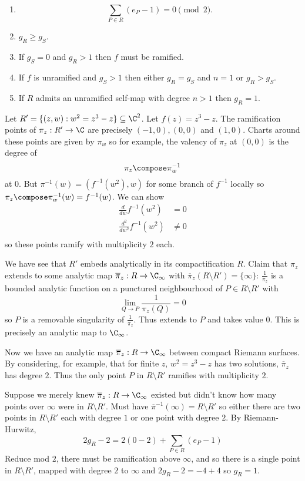 \documentclass[a4paper]{article}
\begin{document}
\begin{corollary}\leavevmode
  \begin{enumerate}
  \item
    \[
      \sum_{P \in R}(e_P - 1) = 0 \pmod 2.
    \]
  \item \(g_R \geq g_S\).
  \item If \(g_S = 0\) and \(g_R > 1\) then \(f\) must be ramified.
  \item If \(f\) is unramified and \(g_S > 1\) then either \(g_R = g_S\) and \(n = 1\) or \(g_R > g_S\).
  \item If \(R\) admits an unramified self-map with degree \(n > 1\) then \(g_R = 1\).
  \end{enumerate}
\end{corollary}

\begin{eg}
  Let \(R' = \{(z, w): w^2 = z^3 - z\} \subseteq \C^2\). Let \(f(z) = z^3 - z\). The ramification points of \(\pi_z: R' \to \C\) are precisely \((-1, 0), (0, 0)\) and \((1, 0)\). Charts around these points are given by \(\pi_w\) so for example, the valency of \(\pi_z\) at \((0, 0)\) is the degree of
  \[
    \pi_z \compose \pi_w^{-1}
  \]
  at \(0\). But \(\pi^{-1}(w) = (f^{-1}(w^2), w)\) for some branch of \(f^{-1}\) locally so \(\pi_z \compose \pi_w^{-1}(w) = f^{-1}(w)\). We can show
  \begin{align*}
    \frac{d}{dw} f^{-1}(w^2) &= 0 \\
    \frac{d^2}{dw^2} f^{-1}(w^2) &\neq 0 \\
  \end{align*}
  so these points ramify with multiplicity \(2\) each.

  We have see that \(R'\) embeds analytically in its compactification \(R\). Claim that \(\pi_z\) extends to some analytic map \(\overline \pi_z: R \to \C_\infty\) with \(\overline \pi_z(R \setminus R') = \{\infty\}\): \(\frac{1}{\pi_z}\) is a bounded analytic function on a punctured neighbourhood of \(P \in R \setminus R'\) with
  \[
    \lim_{Q \to P} \frac{1}{\pi_z(Q)} = 0
  \]
  so \(P\) is a removable singularity of \(\frac{1}{\pi_z}\). Thus extends to \(P\) and takes value \(0\). This is precisely an analytic map to \(\C_\infty\).

  Now we have an analytic map \(\overline \pi_z: R \to \C_\infty\) between compact Riemann surfaces. By considering, for example, that for finite \(z\), \(w^2 = z^3 - z\) has two solutions, \(\overline \pi_z\) has degree \(2\). Thus the only point \(P\) in \(R \setminus R'\) ramifies with multiplicity \(2\).

  Suppose we merely knew \(\overline \pi_z: R \to \C_\infty\) existed but didn't know how many points over \(\infty\) were in \(R \setminus R'\). Must have \(\overline \pi^{-1}(\infty) = R \setminus R'\) so either there are two points in \(R \setminus R'\) each with degree \(1\) or one point with degree \(2\). By Riemann-Hurwitz,
  \[
    2g_R - 2 = 2(0 - 2) + \sum_{P \in R} (e_P - 1)
  \]
  Reduce mod \(2\), there must be ramification above \(\infty\), and so there is a single point in \(R \setminus R'\), mapped with degree \(2\) to \(\infty\) and \(2g_R - 2 = -4 + 4\) so \(g_R = 1\).
\end{eg}
\end{document}
